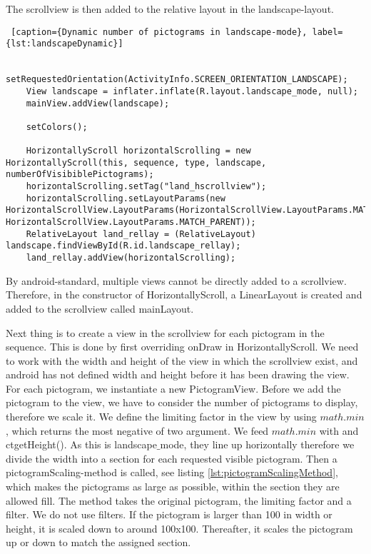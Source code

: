 The scrollview is then added to the relative layout in the landscape-layout.

\begin{lstlisting} [caption={Dynamic number of pictograms in landscape-mode}, label={lst:landscapeDynamic}]

	setRequestedOrientation(ActivityInfo.SCREEN_ORIENTATION_LANDSCAPE);
	View landscape = inflater.inflate(R.layout.landscape_mode, null);
	mainView.addView(landscape);
	
	setColors();
	
	HorizontallyScroll horizontalScrolling = new HorizontallyScroll(this, sequence, type, landscape, numberOfVisibiblePictograms);
	horizontalScrolling.setTag("land_hscrollview");
	horizontalScrolling.setLayoutParams(new HorizontalScrollView.LayoutParams(HorizontalScrollView.LayoutParams.MATCH_PARENT, HorizontalScrollView.LayoutParams.MATCH_PARENT));
	RelativeLayout land_rellay = (RelativeLayout) landscape.findViewById(R.id.landscape_rellay);
	land_rellay.addView(horizontalScrolling);

\end{lstlisting}

By android-standard, multiple views cannot be directly added to a scrollview. Therefore, in the constructor of HorizontallyScroll, a LinearLayout is created and added to the scrollview called mainLayout. 

Next thing is to create a view in the scrollview for each pictogram in the sequence. This is done by first overriding onDraw in HorizontallyScroll. We need to work with the width and height of the view in which the scrollview exist, and android has not defined width and height before it has been drawing the view. For each pictogram, we instantiate a new PictogramView. Before we add the pictogram to the view, we have to consider the number of pictograms to display, therefore we scale it. We define the limiting factor in the view by using $math.min$, which returns the most negative of two argument. We feed $math.min$ with  and ct{getHeight()}. As this is landscape$\_$mode, they line up horizontally therefore we divide the width into a section for each requested visible pictogram. Then a pictogramScaling-method is called, see listing \ref{lst:pictogramScalingMethod}, which makes the pictograms as large as possible, within the section they are allowed fill. The method takes the original pictogram, the limiting factor and a filter. We do not use filters. If the pictogram is larger than 100 in width or height, it is scaled down to around 100x100. Thereafter, it scales the pictogram up or down to match the assigned section. 

